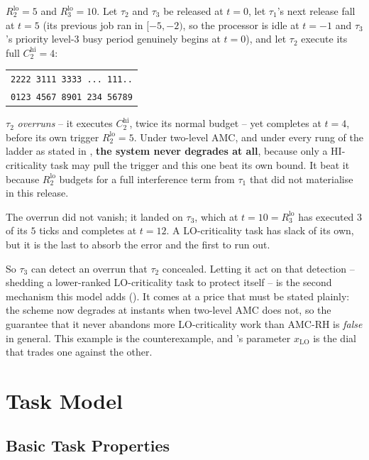 \noindent $R_2^{\mathrm{lo}} = 5$ and $R_3^{\mathrm{lo}} = 10$. Let $\tau_2$
and $\tau_3$ be released at $t = 0$, let $\tau_1$'s next release fall at
$t = 5$ (its previous job ran in $[-5, -2)$, so the processor is idle at
$t = -1$ and $\tau_3$'s priority level-3 busy period genuinely begins at
$t = 0$), and let $\tau_2$ execute its full $C_2^{\mathrm{hi}} = 4$:

\begin{center}
\begin{tabular}{l}
\toprule
\texttt{2222~3111~3333~...~111..} \\
\texttt{0123~4567~8901~234~56789} \\
\bottomrule
\end{tabular}
\end{center}

\noindent $\tau_2$ \emph{overruns} -- it executes $C_2^{\mathrm{hi}}$, twice its
normal budget -- yet completes at $t = 4$, before its own trigger
$R_2^{\mathrm{lo}} = 5$. Under two-level AMC, and under every rung of the
ladder as stated in , \textbf{the system never degrades at
all}, because only a HI-criticality task may pull the trigger and this one beat
its own bound. It beat it because $R_2^{\mathrm{lo}}$ budgets for a full
interference term from $\tau_1$ that did not materialise in this release.

The overrun did not vanish; it landed on $\tau_3$, which at $t = 10 =
R_3^{\mathrm{lo}}$ has executed $3$ of its $5$ ticks and completes at $t = 12$.
A LO-criticality task has slack of its own, but it is the last to absorb the
error and the first to run out.

So $\tau_3$ can detect an overrun that $\tau_2$ concealed. Letting it act on
that detection -- shedding a lower-ranked LO-criticality task to protect
itself -- is the second mechanism this model adds (). It
comes at a price that must be stated plainly: the scheme now degrades at
instants when two-level AMC does not, so the guarantee that it never abandons
more LO-criticality work than AMC-RH is \emph{false} in general. This example
is the counterexample, and 's parameter $x_{\mathrm{LO}}$
is the dial that trades one against the other.

\section{Task Model}

\subsection{Basic Task Properties}


